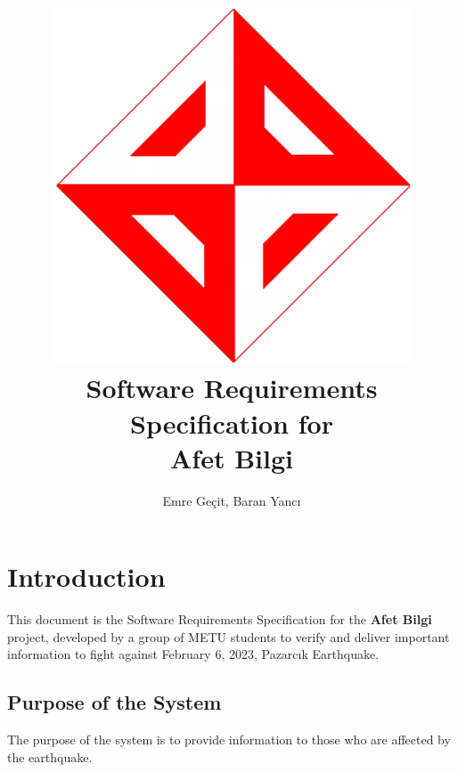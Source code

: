 \documentclass[a4paper]{article}
\author{Emre Geçit, Baran Yancı}
\begin{document}
    \title{\includegraphics[scale=0.2]{assets/ceng_400x400.png}\\ Software Requirements Specification for \\  \textbf{Afet Bilgi}}
    \maketitle

    \newpage
    \makeatletter
	\renewcommand\tableofcontents{%
		\null\hfill\textbf{\Large\contentsname}\hfill\null\par
		\@mkboth{\MakeUppercase\contentsname}{\MakeUppercase\contentsname}%
	}
	\makeatother

    \tableofcontents
    \doublespacing

    \newpage

    \section{Introduction}
        This document is the Software Requirements Specification for the \textbf{Afet Bilgi} project, developed by a group of METU students to verify and deliver important information to fight against February 6, 2023, Pazarcık Earthquake.
        \subsection{Purpose of the System}

            The purpose of the system is to provide information to those who are affected by the earthquake.
\end{document}
